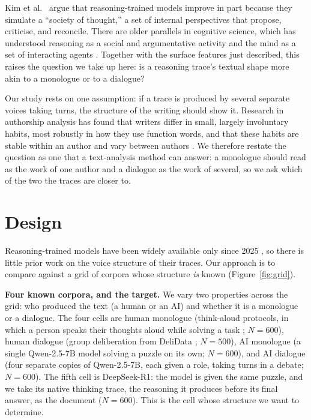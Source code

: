 \documentclass[10pt,twocolumn]{article}
\begin{document}
Kim et al.~\cite{kim2026} argue that reasoning-trained models improve in part because they simulate
a ``society of thought,'' a set of internal perspectives that propose, criticise, and reconcile.
There are older parallels in cognitive science, which has understood reasoning as a social and
argumentative activity \cite{mercier2017} and the mind as a set of interacting agents
\cite{minsky1986}. Together with the surface features just described, this raises the question we
take up here: is a reasoning trace's textual shape more akin to a monologue or to a dialogue?

Our study rests on one assumption: if a trace is produced by several separate voices taking turns,
the structure of the writing should show it. Research in authorship analysis has found that writers
differ in small, largely involuntary habits, most robustly in how they use function words, and that
these habits are stable within an author and vary between authors \cite{stamatatos2009}. We
therefore restate the question as one that a text-analysis method can answer: a monologue should read
as the work of one author and a dialogue as the work of several, so we ask which of the two the
traces are closer to.

\section{Design}
Reasoning-trained models have been widely available only since 2025 \cite{guo2025}, so there is
little prior work on the voice structure of their traces. Our approach is to compare against a grid
of corpora whose structure \emph{is} known (Figure~\ref{fig:grid}).

\textbf{Four known corpora, and the target.} We vary two properties across the grid: who produced
the text (a human or an AI) and whether it is a monologue or a dialogue. The four cells are human
monologue (think-aloud protocols, in which a person speaks their thoughts aloud while solving a task
\cite{wurgaft2025}; $N=600$), human dialogue (group deliberation from DeliData \cite{karadzhov2023};
$N=500$), AI monologue (a single Qwen-2.5-7B model solving a puzzle on its own; $N=600$), and AI
dialogue (four separate copies of Qwen-2.5-7B, each given a role, taking turns in a debate;
$N=600$). The fifth cell is DeepSeek-R1: the model is given the same puzzle, and we take its
native thinking trace, the reasoning it produces before its final answer, as the document ($N=600$).
This is the cell whose structure we want to determine.
\end{document}
